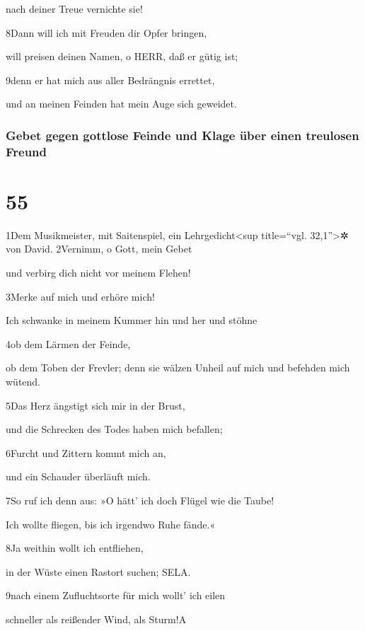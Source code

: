 nach deiner Treue vernichte sie!

8Dann will ich mit Freuden dir Opfer bringen,

will preisen deinen Namen, o HERR, daß er gütig ist;

9denn er hat mich aus aller Bedrängnis errettet,

und an meinen Feinden hat mein Auge sich geweidet.

\hypertarget{gebet-gegen-gottlose-feinde-und-klage-uxfcber-einen-treulosen-freund}{%
\subsubsection{Gebet gegen gottlose Feinde und Klage über einen
treulosen
Freund}\label{gebet-gegen-gottlose-feinde-und-klage-uxfcber-einen-treulosen-freund}}

\hypertarget{section-54}{%
\section{55}\label{section-54}}

1Dem Musikmeister, mit Saitenspiel, ein Lehrgedicht\textless sup
title=``vgl. 32,1''\textgreater✲ von David. 2Vernimm, o Gott, mein Gebet

und verbirg dich nicht vor meinem Flehen!

3Merke auf mich und erhöre mich!

Ich schwanke in meinem Kummer hin und her und stöhne

4ob dem Lärmen der Feinde,

ob dem Toben der Frevler; denn sie wälzen Unheil auf mich und befehden
mich wütend.

5Das Herz ängstigt sich mir in der Brust,

und die Schrecken des Todes haben mich befallen;

6Furcht und Zittern kommt mich an,

und ein Schauder überläuft mich.

7So ruf ich denn aus: »O hätt' ich doch Flügel wie die Taube!

Ich wollte fliegen, bis ich irgendwo Ruhe fände.«

8Ja weithin wollt ich entfliehen,

in der Wüste einen Rastort suchen; SELA.

9nach einem Zufluchtsorte für mich wollt' ich eilen

schneller als reißender Wind, als Sturm!{A}

